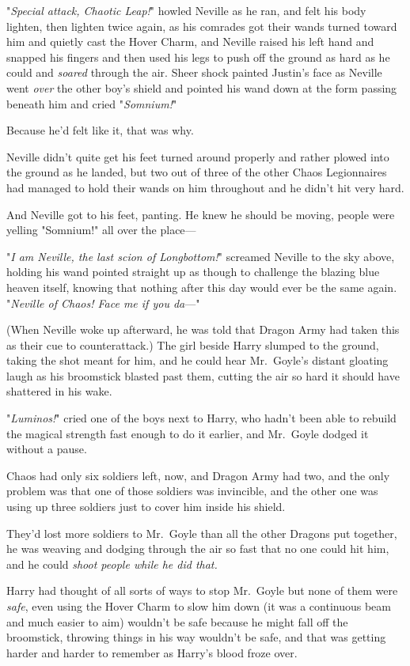 "\emph{Special attack, Chaotic Leap!}" howled Neville as he ran, and felt his
body lighten, then lighten twice again, as his comrades got their wands turned
toward him and quietly cast the Hover Charm, and Neville raised his left hand
and snapped his fingers and then used his legs to push off the ground as hard
as he could and \emph{soared} through the air. Sheer shock painted Justin's
face as Neville went \emph{over} the other boy's shield and pointed his wand
down at the form passing beneath him and cried "\emph{Somnium!}"

Because he'd felt like it, that was why.

Neville didn't quite get his feet turned around properly and rather plowed into
the ground as he landed, but two out of three of the other Chaos Legionnaires
had managed to hold their wands on him throughout and he didn't hit very hard.

And Neville got to his feet, panting. He knew he should be moving, people were
yelling "Somnium!" all over the place---

"\emph{I am Neville, the last scion of Longbottom!}" screamed Neville to the
sky above, holding his wand pointed straight up as though to challenge the
blazing blue heaven itself, knowing that nothing after this day would ever be
the same again. "\emph{Neville of Chaos! Face me if you da}\mbox{---}"

(When Neville woke up afterward, he was told that Dragon Army had taken this as
their cue to counterattack.)
\sbreak
The girl beside Harry slumped to the ground, taking the shot meant for him, and
he could hear Mr.~Goyle's distant gloating laugh as his broomstick blasted past
them, cutting the air so hard it should have shattered in his wake.

"\emph{Luminos!}" cried one of the boys next to Harry, who hadn't been able to
rebuild the magical strength fast enough to do it earlier, and Mr.~Goyle dodged
it without a pause.

Chaos had only six soldiers left, now, and Dragon Army had two, and the only
problem was that one of those soldiers was invincible, and the other one was
using up three soldiers just to cover him inside his shield.

They'd lost more soldiers to Mr.~Goyle than all the other Dragons put together,
he was weaving and dodging through the air so fast that no one could hit him,
and he could \emph{shoot people while he did that.}

Harry had thought of all sorts of ways to stop Mr.~Goyle but none of them were
\emph{safe}, even using the Hover Charm to slow him down (it was a continuous
beam and much easier to aim) wouldn't be safe because he might fall off the
broomstick, throwing things in his way wouldn't be safe, and that was getting
harder and harder to remember as Harry's blood froze over.

